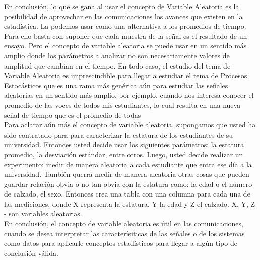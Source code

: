 En conclusión, lo que se gana al usar el concepto de Variable Aleatoria es la posibilidad de aprovechar en las comunicaciones los avances que existen en la estadística. La podemos usar como una alternativa a los promedios de tiempo. Para ello basta con suponer que cada muestra de la señal es el resultado de un ensayo. Pero el concepto de variable aleatoria se puede usar en un sentido más amplio donde los parámetros a analizar no son necesariamente valores de amplitud que cambian en el tiempo. En todo caso, el estudio del tema de Variable Aleatoria es imprescindible para llegar a estudiar el tema de Procesos Estocásticos que es una rama más genérica aún para estudiar las señales aleatorias en un sentido más amplio, por ejemplo, cuando nos interesa conocer el promedio de las voces de todos mis estudiantes, lo cual resulta en una nueva señal de tiempo que es el promedio de todas\\

Para aclarar aún más el concepto de variable aleatoria, supongamos que usted ha sido contratado para  para caracterizar la estatura de los estudiantes de su universidad. Entonces usted decide usar los siguientes parámetros: la estatura promedio, la desviación estándar, entre otros. Luego, usted decide realizar un experimento: medir de manera aleatoria a cada estudiante que entra ese día a la universidad. También querrá medir de manera aleatoria otras cosas que pueden guardar relación obvia o no tan obvia con la estatura como: la edad o el número de calzado, el sexo. Entonces crea una tabla con una columna para cada una de las mediciones, donde X representa la estatura, Y la edad y Z el calzado. X, Y, Z - son variables aleatorias. \\
En conclusión, el concepto de variable aleatoria es útil en las comunicaciones, cuando se desea interpretar las caracterísiticas de las señales o de los sistemas como datos para aplicarle conceptos estadísticos para llegar a algún tipo de conclusión válida.


\begin{table}[h!]
	\captionsetup{justification = raggedright,singlelinecheck = false}
	\caption{\label{tabla:tabla1} Alguna descripción}
		\centering
\end{table}

